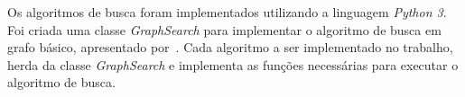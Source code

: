 Os algoritmos de busca foram implementados utilizando a linguagem \textit{Python 3}.
Foi criada uma classe \textit{GraphSearch} para implementar o algoritmo de busca em grafo básico, apresentado por~\cite{russell2010artificial}. Cada algoritmo a ser implementado no trabalho, herda da classe \textit{GraphSearch} e implementa as funções necessárias para executar o algoritmo de busca.










